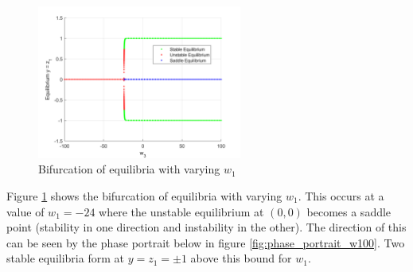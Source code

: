\documentclass{article}
\begin{document}
\begin{figure}[H]
    \centering
    \includegraphics[width=0.6\textwidth]{figures/equilibria_bifurcation.png}
    \caption{Bifurcation of equilibria with varying $w_1$}
    \label{fig:equilibria}
\end{figure}

Figure \ref{fig:equilibria} shows the bifurcation of equilibria with varying $w_1$.
This occurs at a value of $w_1 = -24$ where the unstable equilibrium at $(0,0)$ becomes a saddle point (stability in one direction and instability in the other).
The direction of this can be seen by the phase portrait below in figure \ref{fig:phase_portrait_w100}.
Two stable equilibria form at $y = z_1 = \pm 1$ above this bound for $w_1$.
\end{document}

